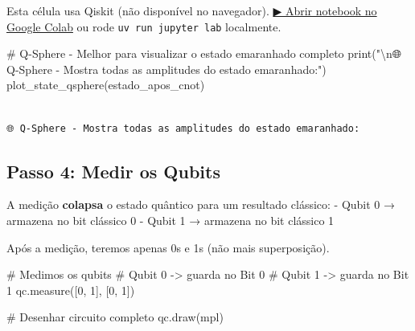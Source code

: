 \documentclass[
  brazilian,
]{report}
\newenvironment{Shaded}{\begin{snugshade}}{\end{snugshade}}
\newcommand{\BuiltInTok}[1]{\textcolor[rgb]{0.00,0.23,0.31}{#1}}
\newcommand{\CharTok}[1]{\textcolor[rgb]{0.13,0.47,0.30}{#1}}
\newcommand{\CommentTok}[1]{\textcolor[rgb]{0.37,0.37,0.37}{#1}}
\newcommand{\NormalTok}[1]{\textcolor[rgb]{0.00,0.23,0.31}{#1}}
\newcommand{\StringTok}[1]{\textcolor[rgb]{0.13,0.47,0.30}{#1}}
\begin{document}
\begin{tcolorbox}[enhanced jigsaw, arc=.35mm, bottomrule=.15mm, bottomtitle=1mm, breakable, colback=white, colbacktitle=quarto-callout-warning-color!10!white, colframe=quarto-callout-warning-color-frame, coltitle=black, left=2mm, leftrule=.75mm, opacityback=0, opacitybacktitle=0.6, rightrule=.15mm, title=\textcolor{quarto-callout-warning-color}{\faExclamationTriangle}\hspace{0.5em}{⚛️ Célula Qiskit --- execute no Colab ou localmente}, titlerule=0mm, toprule=.15mm, toptitle=1mm]

Esta célula usa Qiskit (não disponível no navegador).
\href{https://colab.research.google.com/github/maxwellamaral/aula-quantum/blob/main/notebooks/01-intro.ipynb}{▶
Abrir notebook no Google Colab} ou rode \texttt{uv\ run\ jupyter\ lab}
localmente.

\begin{Shaded}
\begin{Highlighting}[]

\CommentTok{\# Q{-}Sphere {-} Melhor para visualizar o estado emaranhado completo}
\BuiltInTok{print}\NormalTok{(}\StringTok{"}\CharTok{\textbackslash{}n}\StringTok{🌐 Q{-}Sphere {-} Mostra todas as amplitudes do estado emaranhado:"}\NormalTok{)}
\NormalTok{plot\_state\_qsphere(estado\_apos\_cnot)}
\end{Highlighting}
\end{Shaded}

\end{tcolorbox}

\begin{verbatim}

🌐 Q-Sphere - Mostra todas as amplitudes do estado emaranhado:
\end{verbatim}

\subsection{Passo 4: Medir os Qubits}\label{passo-4-medir-os-qubits}

A medição \textbf{colapsa} o estado quântico para um resultado clássico:
- Qubit 0 → armazena no bit clássico 0 - Qubit 1 → armazena no bit
clássico 1

Após a medição, teremos apenas 0s e 1s (não mais superposição).

\begin{Shaded}
\begin{Highlighting}[]

\NormalTok{\# Medimos os qubits}
\NormalTok{\# Qubit 0 {-}\textgreater{} guarda no Bit 0}
\NormalTok{\# Qubit 1 {-}\textgreater{} guarda no Bit 1}
\NormalTok{qc.measure([0, 1], [0, 1])}

\NormalTok{\# Desenhar circuito completo}
\NormalTok{qc.draw(\textquotesingle{}mpl\textquotesingle{})}
\end{Highlighting}
\end{Shaded}
\end{document}

